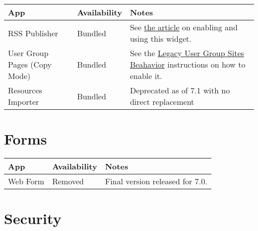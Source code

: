 \noindent\hrulefill

\begin{longtable}[]{@{}
  >{\raggedright\arraybackslash}p{}
  >{\raggedright\arraybackslash}p{}
  >{\raggedright\arraybackslash}p{}@{}}
\toprule\noalign{}
\begin{minipage}[b]{\linewidth}\raggedright
App
\end{minipage} & \begin{minipage}[b]{\linewidth}\raggedright
Availability
\end{minipage} & \begin{minipage}[b]{\linewidth}\raggedright
Notes
\end{minipage} \\
\midrule\noalign{}
\endhead
\bottomrule\noalign{}
\endlastfoot
RSS Publisher & Bundled & See
\href{/docs/7-1/user/-/knowledge_base/u/the-rss-publisher-widget}{the
article} on enabling and using this widget. \\
User Group Pages (Copy Mode) & Bundled & See the
\href{/docs/7-1/user/-/knowledge_base/u/user-group-sites\#legacy-user-group-sites-behavior}{Legacy
User Group Sites Beahavior} instructions on how to enable it. \\
Resources Importer & Bundled & Deprecated as of 7.1 with no direct
replacement \\
\end{longtable}

\noindent\hrulefill

\section{Forms}\label{forms}

\noindent\hrulefill

\begin{longtable}[]{@{}lll@{}}
\toprule\noalign{}
App & Availability & Notes \\
\midrule\noalign{}
\endhead
\bottomrule\noalign{}
\endlastfoot
Web Form & Removed & Final version released for 7.0. \\
\end{longtable}

\noindent\hrulefill

\section{Security}\label{security-1}

